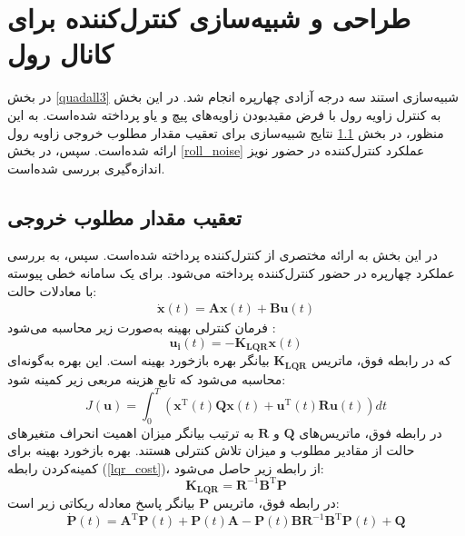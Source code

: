 \section{طراحی و شبیه‌سازی کنترل‌کننده برای کانال رول}\label{roll_lqr_section_simulation}
در بخش
\ref{quadall3}
شبیه‌سازی استند سه درجه آزادی چهارپره انجام شد.
در این بخش به کنترل زاویه رول با فرض مقید‌بودن زاویه‌های پیچ و یاو پرداخته شده‌است. به این منظور، در بخش
\ref{roll_regulator}
نتایج شبیه‌سازی برای تعقیب مقدار مطلوب خروجی زاویه رول ارائه شده‌است. سپس، در بخش
\ref{roll_noise}
عملکرد کنترل‌کننده در  حضور نویز اندازه‌گیری بررسی شده‌است.
\subsection{تعقیب مقدار مطلوب خروجی}\label{roll_regulator}


 در این بخش به ارائه مختصری از کنترل‌کننده  پرداخته شده‌است. سپس، به بررسی عملکرد چهارپره در حضور کنترل‌کننده  پرداخته می‌شود.
 برای یک سامانه خطی پیوسته با معادلات حالت:
\begin{equation}
	\begin{split}
		\boldsymbol{\dot x}(t) = \boldsymbol{Ax}(t) + \boldsymbol{Bu}(t) %
	\end{split}
\end{equation}
فرمان کنترلی بهینه  به‌صورت زیر محاسبه می‌شود
\cite{ogata2010modern}:
\begin{equation}
		\boldsymbol{u_i}(t) = -\boldsymbol{K_{LQR}}\boldsymbol{x}(t)
\end{equation}
که در رابطه فوق، ماتریس $\boldsymbol{K_{LQR}}$ بیانگر بهره بازخورد بهینه است. این بهره به‌گونه‌ای محاسبه می‌شود که تابع هزینه مربعی زیر کمینه شود:
 \begin{equation}\label{lqr_cost}
	J(\boldsymbol u) = \int_{0}^{T}\left( \boldsymbol{x} ^\mathrm{T}(t) \boldsymbol{Q} \boldsymbol{x}(t)+
	\boldsymbol{u} ^\mathrm{T}(t) \boldsymbol{R} \boldsymbol{u}(t)
	\right)dt
\end{equation}
در رابطه فوق، ماتریس‌های $\boldsymbol{Q}$ و $\boldsymbol{R}$ به ترتیب بیانگر میزان اهمیت انحراف متغیرهای حالت از مقادیر مطلوب و میزان تلاش کنترلی هستند. بهره بازخورد بهینه برای کمینه‌کردن رابطه
(\ref{lqr_cost})،
از رابطه زیر حاصل می‌شود:
\begin{equation}
	\boldsymbol{K_{LQR}} = \boldsymbol{R}^{-1}\boldsymbol{B}^\mathrm{T}\boldsymbol{P}
\end{equation}
در رابطه فوق، ماتریس $\boldsymbol{P}$ بیانگر پاسخ معادله ریكاتی زیر است:
\begin{equation}
	\boldsymbol{\dot{P}}(t) = \boldsymbol{A}^\mathrm{T} \boldsymbol{P}(t)  + \boldsymbol{P}(t) \boldsymbol{A} - \boldsymbol{P}(t) \boldsymbol{B} \boldsymbol{R}^{-1}\boldsymbol{B}^\mathrm{T} \boldsymbol{P}(t) + \boldsymbol{Q}
\end{equation}


